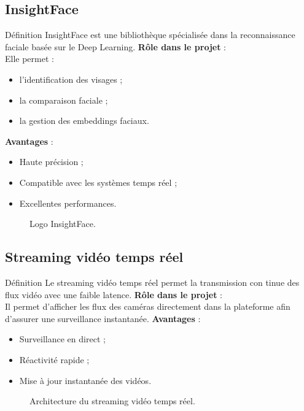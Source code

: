\documentclass[12pt,a4paper]{report}
\numberwithin{figure}{chapter}
\numberwithin{table}{chapter}
\begin{document}
\subsection{InsightFace}
Déﬁnition
InsightFace est une bibliothèque spécialisée dans la reconnaissance faciale basée sur le Deep
Learning.
\textbf{Rôle dans le projet} : \\
Elle permet :
\begin{itemize}
  \item l’identiﬁcation des visages ;
  \item la comparaison faciale ;
  \item la gestion des embeddings faciaux.
\end{itemize}
\textbf{Avantages} : \\
\begin{itemize}
  \item Haute précision ;
  \item Compatible avec les systèmes temps réel ;
  \item Excellentes performances.
\end{itemize}
\begin{figure}[H]
  \centering
  \caption{Logo InsightFace.}
\end{figure}
\subsection{Streaming vidéo temps réel}
Déﬁnition
Le streaming vidéo temps réel permet la transmission con tinue des ﬂux vidéo avec une faible latence.
\textbf{Rôle dans le projet} : \\
Il permet d’aﬃcher les ﬂux des caméras directement dans la plateforme aﬁn d’assurer une
surveillance instantanée.
\textbf{Avantages} : \\
\begin{itemize}
  \item Surveillance en direct ;
  \item Réactivité rapide ;
  \item Mise à jour instantanée des vidéos.
\end{itemize}
\begin{figure}[H]
  \centering
  \caption{Architecture du streaming vidéo temps réel.}
\end{figure}
\end{document}
